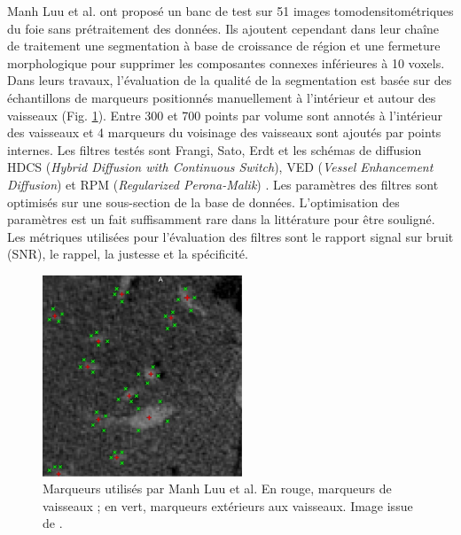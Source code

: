 Manh Luu et al. \cite{Luu2015_liver_vesselness_comparison} ont proposé un banc de test sur 51 images tomodensitométriques du foie sans prétraitement des données. Ils ajoutent cependant dans leur chaîne de traitement une segmentation à base de croissance de région et une fermeture morphologique pour supprimer les composantes connexes inférieures à 10 voxels. Dans leurs travaux, l'évaluation de la qualité de la segmentation est basée sur des échantillons de marqueurs positionnés manuellement à l'intérieur et autour des vaisseaux (Fig. \ref{fig:ManhLuu_markers}). Entre 300 et 700 points par volume sont annotés à l'intérieur des vaisseaux et 4 marqueurs du voisinage des vaisseaux sont ajoutés par points internes. Les filtres testés sont Frangi, Sato, Erdt \cite{Erdt2008_liver_vesselness} et les schémas de diffusion HDCS (\textit{Hybrid Diffusion with Continuous Switch}), VED (\textit{Vessel Enhancement Diffusion}) et RPM (\textit{Regularized Perona-Malik}) \cite{perona1990scale}. Les paramètres des filtres sont optimisés sur une sous-section de la base de données. L'optimisation des paramètres est un fait suffisamment rare dans la littérature pour être souligné. Les métriques utilisées pour l'évaluation des filtres sont le rapport signal sur bruit (SNR), le rappel, la justesse et la spécificité.
\begin{figure}[!ht]
  \centering
  \includegraphics[height=6cm]{Images/ManhLuu_markers.png}
  \caption{Marqueurs utilisés par Manh Luu et al. En rouge, marqueurs de vaisseaux ; en vert, marqueurs extérieurs aux vaisseaux. Image issue de \cite{Luu2015_liver_vesselness_comparison}. }
  \label{fig:ManhLuu_markers}
\end{figure}

